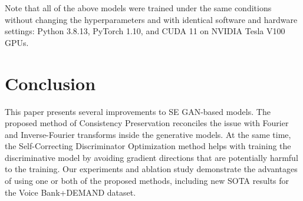 \documentclass{article}
\def\L{{\cal L}}
\renewcommand{\L}{\mathcal{L}}
\begin{document}
Note that all of the above models were trained under the same conditions without changing the hyperparameters and with identical software and hardware settings: Python 3.8.13, PyTorch 1.10, and CUDA 11 on NVIDIA Tesla V100 GPUs.

\begin{table}[t]
    \centering
    \caption{\textbf{Ablation Study on Voice Bank + DEMAND:} STOI results are equal to 0.96 for all the tests; $^\dagger$ - results from our tests; ND - Noisy Data, CP - Consistency Preserving method, SC$_{2}$ - SC with $\L_C$ and $\L_E$, SC$_{3}$ - SC with $\L_C$, $\L_E$, $\L_N$.}
    \label{tab:abs_study}
\end{table}


\section{Conclusion}\label{sec:conclusion}
This paper presents several improvements to SE GAN-based models. The proposed method of Consistency Preservation reconciles the issue with Fourier and Inverse-Fourier transforms inside the generative models. At the same time, the Self-Correcting Discriminator Optimization method helps with training the discriminative model by avoiding gradient directions that are potentially harmful to the training. Our experiments and ablation study demonstrate the advantages of using one or both of the proposed methods, including new SOTA results for the Voice Bank+DEMAND dataset.



\clearpage


\end{document}
